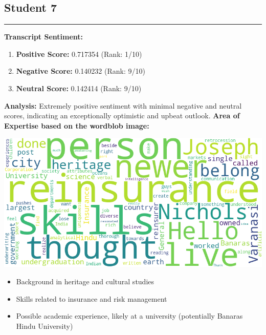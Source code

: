 \documentclass{article}
\begin{document}
\subsection{Student 7}
\begin{center}
    \color{green}\rule{1\linewidth}{0.7mm}
\end{center}
\vspace{0.1in}
\large{\textbf{Transcript Sentiment:}}
\begin{tcolorbox}[colback=blue!5!white,colframe=blue!75!black,title=Sentiment Breakdown]
    \begin{enumerate}
        \item \textbf{Positive Score:} \textcolor{green!70!black}{0.717354} (Rank: 1/10)
        \item \textbf{Negative Score:} \textcolor{red!70!black}{0.140232} (Rank: 9/10)
        \item \textbf{Neutral Score:} \textcolor{blue!70!black}{0.142414} (Rank: 9/10)
    \end{enumerate}
\end{tcolorbox}
\textbf{Analysis:} Extremely positive sentiment with minimal negative and neutral scores, indicating an exceptionally optimistic and upbeat outlook.
\vspace{0.3in}
\LARGE \textbf{Area of Expertise based on the wordblob image:} \normalsize
\begin{center}
    \includegraphics[width=1\columnwidth]{images/wordcloud_7.png}
\end{center}
\begin{itemize}
    \item Background in heritage and cultural studies
    \item Skills related to insurance and risk management
    \item Possible academic experience, likely at a university (potentially Banaras Hindu University)
\end{itemize}
\end{document}
